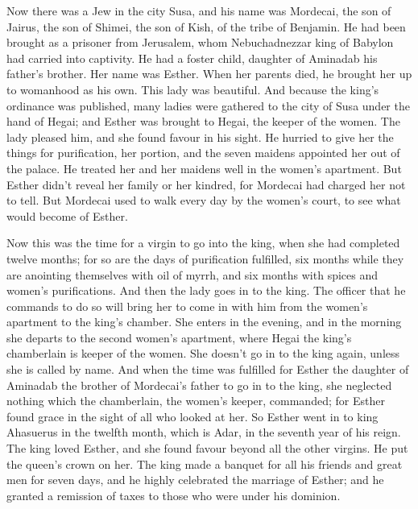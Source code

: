  Now there was a Jew in the city Susa, and his name was
Mordecai, the son of Jairus, the son of Shimei, the son of Kish, of the
tribe of Benjamin.  He had been brought as a prisoner from
Jerusalem, whom Nebuchadnezzar king of Babylon had carried into
captivity.  He had a foster child, daughter of Aminadab his
father's brother. Her name was Esther. When her parents died, he brought
her up to womanhood as his own. This lady was beautiful. 
And because the king's ordinance was published, many ladies were
gathered to the city of Susa under the hand of Hegai; and Esther was
brought to Hegai, the keeper of the women.  The lady pleased
him, and she found favour in his sight. He hurried to give her the
things for purification, her portion, and the seven maidens appointed
her out of the palace. He treated her and her maidens well in the
women's apartment.  But Esther didn't reveal her family or
her kindred, for Mordecai had charged her not to tell.  But
Mordecai used to walk every day by the women's court, to see what would
become of Esther.

 Now this was the time for a virgin to go into the king,
when she had completed twelve months; for so are the days of
purification fulfilled, six months while they are anointing themselves
with oil of myrrh, and six months with spices and women's purifications.
 And then the lady goes in to the king. The officer that he
commands to do so will bring her to come in with him from the women's
apartment to the king's chamber.  She enters in the
evening, and in the morning she departs to the second women's apartment,
where Hegai the king's chamberlain is keeper of the women. She doesn't
go in to the king again, unless she is called by name.  And
when the time was fulfilled for Esther the daughter of Aminadab the
brother of Mordecai's father to go in to the king, she neglected nothing
which the chamberlain, the women's keeper, commanded; for Esther found
grace in the sight of all who looked at her.  So Esther
went in to king Ahasuerus in the twelfth month, which is Adar, in the
seventh year of his reign.  The king loved Esther, and she
found favour beyond all the other virgins. He put the queen's crown on
her.  The king made a banquet for all his friends and great
men for seven days, and he highly celebrated the marriage of Esther; and
he granted a remission of taxes to those who were under his dominion.

